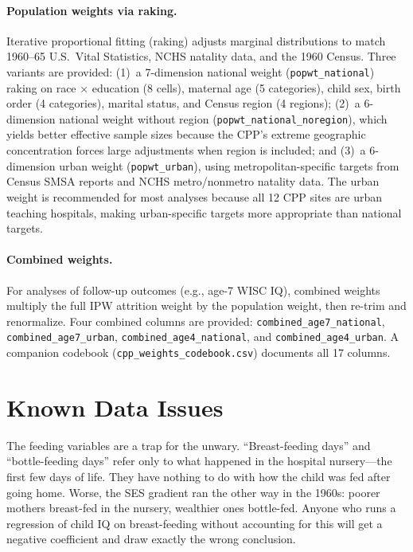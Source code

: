 \documentclass[12pt]{article}
\begin{document}
\paragraph{Population weights via raking.} Iterative proportional fitting (raking) adjusts marginal distributions to match 1960--65 U.S.\ Vital Statistics, NCHS natality data, and the 1960 Census. Three variants are provided: (1)~a 7-dimension national weight (\texttt{popwt\_national}) raking on race $\times$ education (8 cells), maternal age (5 categories), child sex, birth order (4 categories), marital status, and Census region (4 regions); (2)~a 6-dimension national weight without region (\texttt{popwt\_national\_noregion}), which yields better effective sample sizes because the CPP's extreme geographic concentration forces large adjustments when region is included; and (3)~a 6-dimension urban weight (\texttt{popwt\_urban}), using metropolitan-specific targets from Census SMSA reports and NCHS metro/nonmetro natality data. The urban weight is recommended for most analyses because all 12 CPP sites are urban teaching hospitals, making urban-specific targets more appropriate than national targets.

\paragraph{Combined weights.} For analyses of follow-up outcomes (e.g., age-7 WISC IQ), combined weights multiply the full IPW attrition weight by the population weight, then re-trim and renormalize. Four combined columns are provided: \texttt{combined\_age7\_national}, \texttt{combined\_age7\_urban}, \texttt{combined\_age4\_national}, and \texttt{combined\_age4\_urban}. A companion codebook (\texttt{cpp\_weights\_codebook.csv}) documents all 17 columns.

\section{Known Data Issues}

The feeding variables are a trap for the unwary. ``Breast-feeding days'' and ``bottle-feeding days'' refer only to what happened in the hospital nursery---the first few days of life. They have nothing to do with how the child was fed after going home. Worse, the SES gradient ran the other way in the 1960s: poorer mothers breast-fed in the nursery, wealthier ones bottle-fed. Anyone who runs a regression of child IQ on breast-feeding without accounting for this will get a negative coefficient and draw exactly the wrong conclusion.
\end{document}
